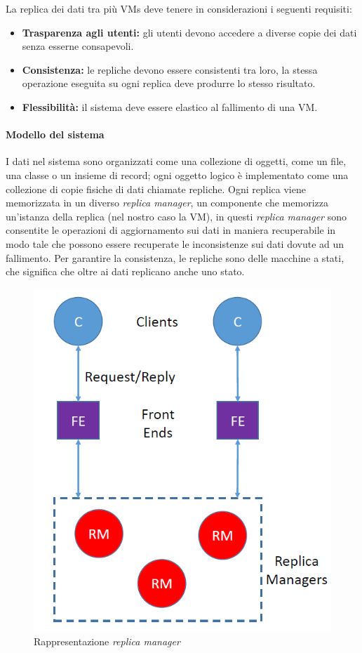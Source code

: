 \documentclass{article}
\begin{document}
La replica dei dati tra più VMs deve tenere in considerazioni i seguenti requisiti:
\begin{itemize}
    \item \textbf{Trasparenza agli utenti:} gli utenti devono accedere a diverse copie dei dati senza esserne consapevoli.
    \item \textbf{Consistenza:} le repliche devono essere consistenti tra loro, la stessa operazione eseguita su ogni replica deve produrre lo stesso risultato.
    \item \textbf{Flessibilità:} il sistema deve essere elastico al fallimento di una VM.
\end{itemize}
\paragraph{Modello del sistema}
I dati nel sistema sono organizzati come una collezione di oggetti, come un file, una classe o un insieme di record; ogni oggetto logico è implementato come una collezione di copie fisiche di dati chiamate repliche. Ogni replica viene memorizzata in un diverso \textit{replica manager}, un componente che memorizza un'istanza della replica (nel nostro caso la VM), in questi \textit{replica manager} sono consentite le operazioni di aggiornamento sui dati in maniera recuperabile in modo tale che possono essere recuperate le inconsistenze sui dati dovute ad un fallimento.
Per garantire la consistenza, le repliche sono delle macchine a stati, che significa che oltre ai dati replicano anche uno stato.

\begin{figure}[H]
\centering
\includegraphics[scale=0.5]{img/RManager.PNG}
\caption{Rappresentazione \textit{replica manager}}
\end{figure}
\end{document}
